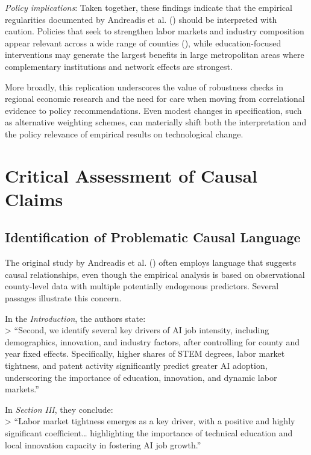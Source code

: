 \documentclass[
]{article}
\begin{document}
\emph{Policy implications}: Taken together, these findings indicate that
the empirical regularities documented by Andreadis et al.
() should be interpreted with caution.
Policies that seek to strengthen labor markets and industry composition
appear relevant across a wide range of counties
(), while
education-focused interventions may generate the largest benefits in
large metropolitan areas where complementary institutions and network
effects are strongest.

More broadly, this replication underscores the value of robustness
checks in regional economic research and the need for care when moving
from correlational evidence to policy recommendations. Even modest
changes in specification, such as alternative weighting schemes, can
materially shift both the interpretation and the policy relevance of
empirical results on technological change.

\section{Critical Assessment of Causal
Claims}\label{critical-assessment-of-causal-claims}

\subsection{Identification of Problematic Causal
Language}\label{identification-of-problematic-causal-language}

The original study by Andreadis et al.
() often employs language that
suggests causal relationships, even though the empirical analysis is
based on observational county-level data with multiple potentially
endogenous predictors. Several passages illustrate this concern.

In the \emph{Introduction}, the authors state:\\
\textgreater{} ``Second, we identify several key drivers of AI job
intensity, including demographics, innovation, and industry factors,
after controlling for county and year fixed effects. Specifically,
higher shares of STEM degrees, labor market tightness, and patent
activity significantly predict greater AI adoption, underscoring the
importance of education, innovation, and dynamic labor markets.''

In \emph{Section III}, they conclude:\\
\textgreater{} ``Labor market tightness emerges as a key driver, with a
positive and highly significant coefficient\ldots{} highlighting the
importance of technical education and local innovation capacity in
fostering AI job growth.''
\end{document}
